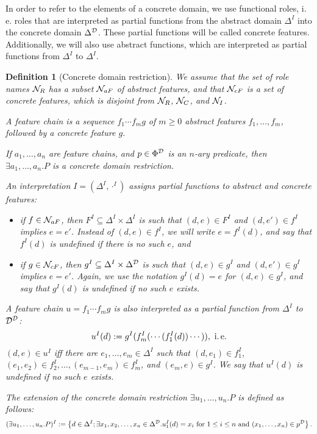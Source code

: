 \documentclass[openany]{scrbook}
\theoremstyle{break}
\newtheorem{Definition}[Theorem]{Definition}
\theoremstyle{nonumberbreak}
\theoremstyle{nonumberplain}
\theoremstyle{nonumberbreak}
\newcommand{\set}[1]{\left\{#1\right\}}
\newcommand{\ie}{i{.}\,e{.}\xspace}
\begin{document}
In order to refer to the elements of a concrete domain, we use
functional roles, \ie roles that are interpreted as partial functions
from the abstract domain $\Delta^I$ into the concrete domain
$\Delta^{\cal D}$. These partial functions will be called concrete
features. Additionally, we will also use abstract functions, which are
interpreted as partial functions from $\Delta^I$ to $\Delta^I$.

\begin{Definition}[Concrete domain restriction]
  \label{7.7}
  We assume that the set of role names ${\cal N}_R$ has a subset
  ${\cal N}_{aF}$ of abstract features, and that ${\cal N}_{cF}$ is a
  set of concrete features, which is disjoint from ${\cal N}_R$,
  ${\cal N}_C$, and ${\cal N}_I$.

  A feature chain is a sequence $f_1 \dotsm f_m g$ of $m \geq 0$
  abstract features $f_1, \dotsc, f_m$, followed by a concrete
  feature $g$.

  If $a_1, \dotsc, a_n$ are feature chains, and $p \in \Phi^{\cal D}$
  is an $n$-ary predicate, then $\exists a_1, \dotsc, a_n.P$ is a
  concrete domain restriction.

  An interpretation $I = (\Delta^I, \cdot^I)$ assigns partial
  functions to abstract and concrete features:
  \begin{itemize}
  \item if $f \in {\cal N}_{aF}$, then $F^I \subseteq \Delta^I \times
    \Delta^I$ is such that $(d, e) \in F^I$ and $(d, e') \in f^I$
    implies $e = e'$. Instead of $(d, e) \in f^I$, we will write $e =
    f^I(d)$, and say that $f^I(d)$ is undefined if there is no such
    $e$, and
  \item if $g \in {\cal N}_{cF}$, then $g^I \subseteq \Delta^I \times
    \Delta^{\cal D}$ is such that $(d, e) \in g^I$ and $(d, e') \in
    g^I$ implies $e = e'$. Again, we use the notation $g^I(d) = e$ for
    $(d, e) \in g^I$, and say that $g^I(d)$ is undefined if no such
    $e$ exists.
  \end{itemize}

  A feature chain $u = f_1 \dotsm f_m g$ is also interpreted as a
  partial function from $\Delta^I$ to ${\cal D}^{\cal D}$:
  \begin{equation*}
    u^I(d) := g^I(f_m^I(\dotsb(f_1^I(d))\dotsb)),\ \text{\ie}
  \end{equation*}
  $(d, e) \in u^I$ iff there are $e_1, \dotsc, e_m \in \Delta^I$ such
  that $(d, e_1) \in f_1^I$, $(e_1, e_2) \in f_2^I, \dotsc, (e_{m -
    1}, e_m) \in f_m^I$, and $(e_m, e) \in g^I$. We say that $u^I(d)$
  is undefined if no such $e$ exists.

  The extension of the concrete domain restriction $\exists u_1, \dotsc,
  u_n. P$ is defined as follows:
  \begin{equation*}
    (\exists u_1, \dotsc, u_n.P)^I := \set{d \in \Delta^I; \exists
      x_1, x_2, \dotsc, x_n \in \Delta^{\cal D}. u_1^I(d) = x_i\
      \text{for}\ 1 \leq i \leq n\ \text{and}\ (x_1, \dotsc, x_n) \in
      p^{\cal D}}.
  \end{equation*}
\end{Definition}
\end{document}

